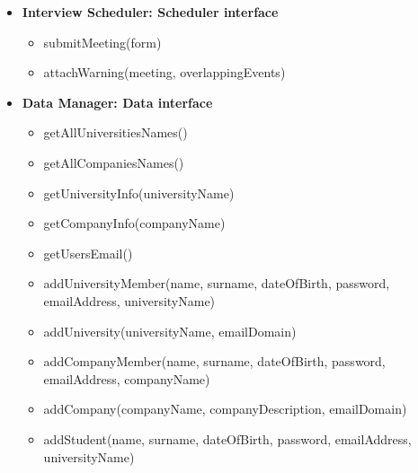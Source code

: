 \begin{itemize}
\begin{itemize}
        \item addCompany(companyID)
        \item deleteCompany(companyID)
        \item addStudent(studentID)
        \item deleteStudent(studentID)
        \item getStudentRecommendations(studentID)
        \item getCompanyRecommendations(companyID)
        \item addInternship(companyID, internshipID, tags)
        \item updateInternshipTags(companyID, internshipID, tagsRemoved, tagsAdded)
        \item deleteInternship(companyID, internshipID)
        \item updateCV(digitalizedCV)
        \item updateScores(internshipId, internshipTags, studentTags, grades)
    \end{itemize}
    \item \textbf{Interview Scheduler: Scheduler interface}
    \begin{itemize}
        \item submitMeeting(form)
        \item attachWarning(meeting, overlappingEvents)
    \end{itemize}
    \item \textbf{Data Manager: Data interface}
    \begin{itemize}
        \item getAllUniversitiesNames()
        \item getAllCompaniesNames()
        \item getUniversityInfo(universityName)
        \item getCompanyInfo(companyName)
        \item getUsersEmail()
        \item addUniversityMember(name, surname, dateOfBirth, password, emailAddress, universityName)
        \item addUniversity(universityName, emailDomain)
        \item addCompanyMember(name, surname, dateOfBirth, password, emailAddress, companyName)
        \item addCompany(companyName, companyDescription, emailDomain)
        \item addStudent(name, surname, dateOfBirth, password, emailAddress, universityName)

\end{itemize}
\end{itemize}
